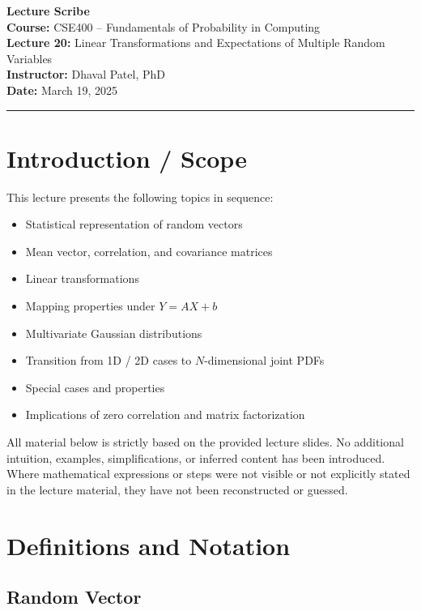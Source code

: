 \documentclass[12pt]{article}
\begin{document}
\begin{center}
\textbf{\Large Lecture Scribe} \\[6pt]
\textbf{Course:} CSE400 – Fundamentals of Probability in Computing \\
\textbf{Lecture 20:} Linear Transformations and Expectations of Multiple Random Variables \\
\textbf{Instructor:} Dhaval Patel, PhD \\
\textbf{Date:} March 19, 2025
\end{center}

\hrule
\vspace{8pt}

\section*{Introduction / Scope}

This lecture presents the following topics in sequence:

\begin{itemize}
\item Statistical representation of random vectors
\item Mean vector, correlation, and covariance matrices
\item Linear transformations
\item Mapping properties under \( Y = AX + b \)
\item Multivariate Gaussian distributions
\item Transition from 1D / 2D cases to \( N \)-dimensional joint PDFs
\item Special cases and properties
\item Implications of zero correlation and matrix factorization
\end{itemize}

All material below is strictly based on the provided lecture slides.  
No additional intuition, examples, simplifications, or inferred content has been introduced.  
Where mathematical expressions or steps were not visible or not explicitly stated in the lecture material, they have not been reconstructed or guessed.

\section*{Definitions and Notation}

\subsection*{Random Vector}
\end{document}
